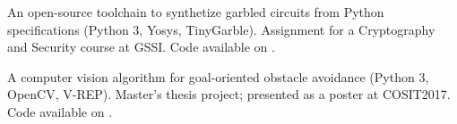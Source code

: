 \documentclass[a4paper]{deedy-resume-openfont}
\begin{document}
\begin{minipage}[t]{0.67\textwidth}
\begin{tightemize}
\item 
An open-source toolchain to synthetize garbled circuits from Python specifications (Python 3, Yosys, TinyGarble). 
Assignment for a Cryptography and Security course at GSSI.
Code available on \href{https://github.com/lou1306/gssi/blob/master/2pc/}{}.
\item
A computer vision algorithm
for goal-oriented obstacle avoidance (Python 3, OpenCV, V-REP). 
Master's thesis project; presented as a poster at COSIT2017. 
Code available on \href{https://github.com/lou1306/localpathplanner}{}.
\end{tightemize}

\end{minipage} 
\end{document}

